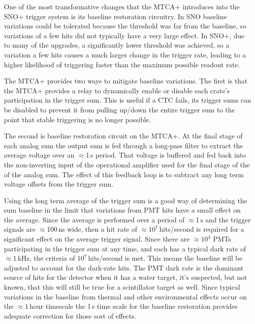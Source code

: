 One of the most transformative changes that the MTCA+ introduces into
the SNO+ trigger system is its baseline restoration circuitry.
In SNO baseline variations could be tolerated because
the threshold was far from the baseline, so variations of a few hits
did not typically have a very large effect.
In SNO+, due to many of the upgrades, a significantly lower threshold was achieved,
so a variation a few hits causes a much larger change in the trigger rate,
leading to a higher likelihood of triggering faster than the  maximum possible
readout rate.

The MTCA+ provides two ways to mitigate baseline variations.
The first is that the MTCA+ provides a relay to dynamically enable or disable each
crate's participation in the trigger sum.
This is useful if a CTC fails, its trigger sums can be disabled to prevent it from
pulling up/down the entire trigger sum to the point that stable triggering is no
longer possible.

The second is baseline restoration circuit on the MTCA+. At the final
stage of each analog sum the output sum is fed through a long-pass
filter to extract the average voltage over an $\approx$1\,s period.
That voltage is buffered and fed back into the non-inverting input
of the operational amplifier used for the final stage of the
of the analog sum.
The effect of this feedback loop is to subtract any long term
voltage offsets from the trigger sum.

Using the long term average of the trigger sum is a good way of
determining the sum baseline in the limit that variations from
PMT hits have a small effect on the average.
Since the average is performed over a period of $\approx$1\,s
and the trigger signals are $\approx$100\,ns wide, then a hit
rate of $\approx 10^7$\,hits/second is required for a significant
effect on the average trigger signal.
Since there are $\approx10^4$ PMTs participating in the trigger sum
at any time, and each has a typical dark rate of $\approx1$\,kHz, the
criteria of $10^7$\,hits/second is met.
This means the baseline will be adjusted to account for the dark-rate hits.
The PMT dark rate is the dominant source of hits for the detector when it has
a water target, it's suspected, but not known, that this will still be true for
a scintillator target as well.
Since typical variations in the baseline from thermal and other environmental
effects occur on the $\approx1$\,hour timescale the 1\,s time scale for the
baseline restoration provides adequate correction for those sort of effects.



